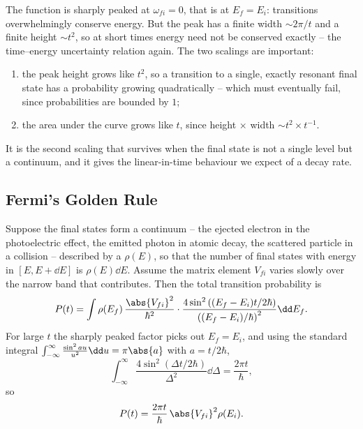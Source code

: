 \begin{center}
\end{center}

The function is sharply peaked at $\omega_{fi} = 0$, that is at $E_f = E_i$: transitions overwhelmingly conserve energy. But the peak has a finite width $\sim 2\pi/t$ and a finite height $\sim t^2$, so at short times energy need not be conserved exactly -- the time--energy uncertainty relation again. The two scalings are important:
\begin{enumerate}[label=(\roman*)]
    \item the peak height grows like $t^2$, so a transition to a single, exactly resonant final state has a probability growing quadratically -- which must eventually fail, since probabilities are bounded by $1$;
    \item the area under the curve grows like $t$, since height $\times$ width $\sim t^2 \times t^{-1}$.
\end{enumerate}
It is the second scaling that survives when the final state is not a single level but a continuum, and it gives the linear-in-time behaviour we expect of a decay rate.

\subsection{Fermi's Golden Rule}

Suppose the final states form a continuum -- the ejected electron in the photoelectric effect, the emitted photon in atomic decay, the scattered particle in a collision -- described by a  $\rho(E)$, so that the number of final states with energy in $[E, E+\dd E]$ is $\rho(E)\dd E$. Assume the matrix element $V_{fi}$ varies slowly over the narrow band that contributes. Then the total transition probability is
$$
P(t) = \int \rho(E_f)\, \frac{\abs{V_{fi}}^2}{\hbar^2}\cdot\frac{4\sin^2\left((E_f-E_i)t/2\hbar\right)}{\left((E_f-E_i)/\hbar\right)^2}\dd E_f.
$$
For large $t$ the sharply peaked factor picks out $E_f = E_i$, and using the standard integral $\int_{-\infty}^{\infty}\frac{\sin^2 a u}{u^2}\dd u = \pi \abs{a}$ with $a = t/2\hbar$,
$$
\int_{-\infty}^{\infty}\frac{4\sin^2\left(\Delta t/2\hbar\right)}{\Delta^2}\dd \Delta = \frac{2\pi t}{\hbar},
$$
so
$$
P(t) = \frac{2\pi t}{\hbar}\,\abs{V_{fi}}^2\rho(E_i).
$$


